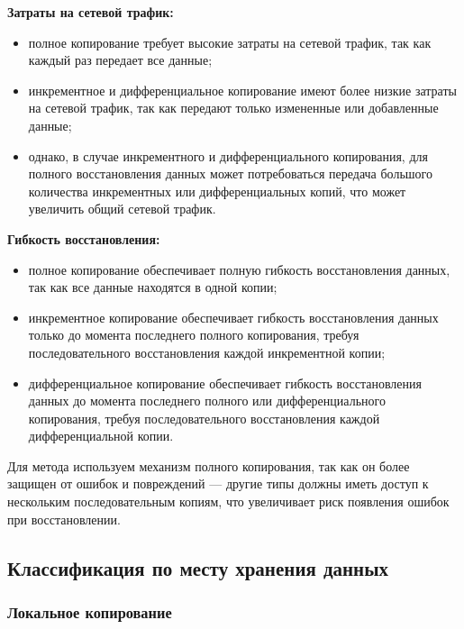 \begin{flushleft}
\textbf{Затраты на сетевой трафик:}
\end{flushleft}

\begin{itemize}
\item полное копирование требует высокие затраты на сетевой трафик, так как каждый раз передает все данные;
\item инкрементное и дифференциальное копирование имеют более низкие затраты на сетевой трафик, так как передают только измененные или добавленные данные;
\item однако, в случае инкрементного и дифференциального копирования, для полного восстановления данных может потребоваться передача большого количества инкрементных или дифференциальных копий, что может увеличить общий сетевой трафик.
\end{itemize}

\begin{flushleft}
\textbf{Гибкость восстановления:}
\end{flushleft}

\begin{itemize}
\item полное копирование обеспечивает полную гибкость восстановления данных, так как все данные находятся в одной копии;
\item инкрементное копирование обеспечивает гибкость восстановления данных только до момента последнего полного копирования, требуя последовательного восстановления каждой инкрементной копии;
\item дифференциальное копирование обеспечивает гибкость восстановления данных до момента последнего полного или дифференциального копирования, требуя последовательного восстановления каждой дифференциальной копии.
\end{itemize}

Для метода используем механизм полного копирования, так как он более защищен от ошибок и повреждений --- другие типы должны иметь доступ к нескольким последовательным копиям, 
что увеличивает риск появления ошибок при восстановлении. 

\newpage

\subsection{Классификация по месту хранения данных}

\subsubsection{Локальное копирование}

